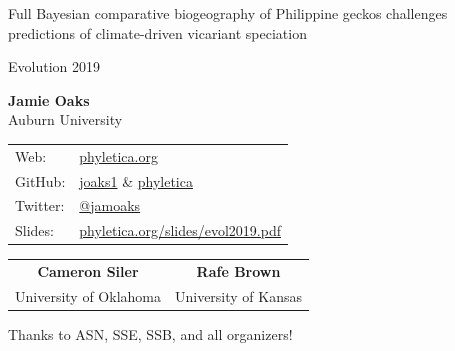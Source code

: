 % 
\begin{frame}[t]
    \vspace{1ex}
    \begin{displaybox}[0.95\linewidth]
    \begin{center}
        \begin{minipage}[c][0.15\textheight][c]{0.95\linewidth}
            \begin{center}
                \Large Full Bayesian comparative biogeography of Philippine
                geckos challenges predictions of climate-driven vicariant
                speciation
            \end{center}
        \end{minipage}
    \end{center}
    \end{displaybox}

    \begin{center}
        {\large Evolution 2019}

        \vspace{2ex}
        {\Large\bf Jamie Oaks} \\
        Auburn University \\
        \begin{tabular}{@{}ll@{}}
            Web: & \href{http://phyletica.org}{phyletica.org} \\
            GitHub: & \href{https://github.com/joaks1}{joaks1} \& \href{https://github.com/phyletica}{phyletica} \\
            Twitter: & \href{https://twitter.com/jamoaks}{{@}jamoaks} \\
            Slides: & \href{http://phyletica.org/slides/evol2019.pdf}{phyletica.org/slides/evol2019.pdf} 
        \end{tabular}

        \vspace{2ex}
        \begin{tabular}{@{}c@{\hskip 8em}c@{}}
        {\Large\bf Cameron Siler} & {\Large\bf Rafe Brown} \\
        University of Oklahoma & University of Kansas
        \end{tabular}

        \vspace{2ex}
        Thanks to ASN, SSE, SSB, and all organizers!
    \end{center}
\end{frame}

